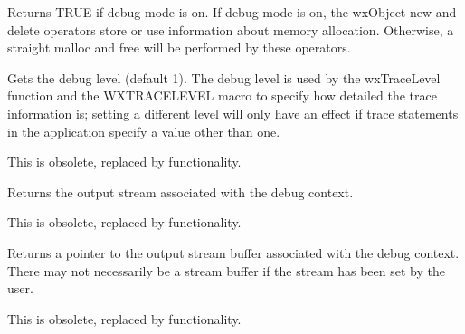 \label{wxdebugcontextgetdebugmode}


Returns TRUE if debug mode is on. If debug mode is on, the wxObject new and delete
operators store or use information about memory allocation. Otherwise,
a straight malloc and free will be performed by these operators.



\label{wxdebugcontextgetlevel}


Gets the debug level (default 1). The debug level is used by the wxTraceLevel function and
the WXTRACELEVEL macro to specify how detailed the trace information is; setting
a different level will only have an effect if trace statements in the application
specify a value other than one.

This is obsolete, replaced by  functionality.



\label{wxdebugcontextgetstream}


Returns the output stream associated with the debug context.

This is obsolete, replaced by  functionality.



\label{wxdebugcontextgetstreambuf}


Returns a pointer to the output stream buffer associated with the debug context.
There may not necessarily be a stream buffer if the stream has been set
by the user.

This is obsolete, replaced by  functionality.

\label{wxdebugcontexthasstream}


